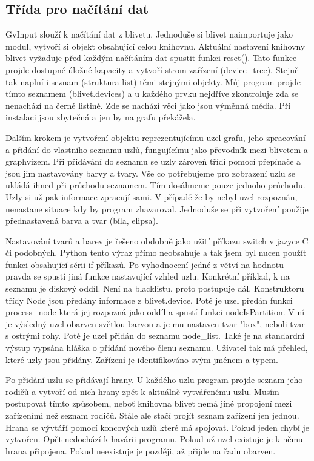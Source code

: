 \documentclass[color,table,oneside,nolot,nolof]{fithesis}
\begin{document}
\subsection{Třída pro načítání dat}
	GvInput slouží k načítání dat z blivetu. Jednoduše si blivet naimportuje jako modul, vytvoří si objekt obsahující celou knihovnu. Aktuální nastavení knihovny blivet vyžaduje před 
	každým načítáním dat spustit funkci reset(). Tato funkce projde dostupné úložné kapacity a vytvoří strom zařízení (device_tree). Stejně tak naplní i seznam (struktura list) těmi
	stejnými objekty. Můj program projde tímto seznamem (blivet.devices) a u každého prvku nejdříve zkontroluje zda se nenachází na černé listině. Zde se nachází věci jako jsou 
	výměnná média. Při instalaci jsou zbytečná a jen by na grafu překážela.

	Dalším krokem je vytvoření objektu reprezentujícímu uzel grafu, jeho zpracování a přidání do vlastního seznamu uzlů, fungujícímu jako převodník mezi blivetem a graphvizem. Při
	přidávání do seznamu se uzly zároveň třídí pomocí přepínače a jsou jim nastavovány barvy a tvary. Vše co potřebujeme pro zobrazení uzlu se ukládá ihned při průchodu seznamem. 
	Tím dosáhneme pouze jednoho průchodu. Uzly si už pak informace zpracují sami. V případě že by nebyl uzel rozpoznán, nenastane situace kdy by program zhavaroval. Jednoduše 
	se při vytvoření použije přednastavená barva a tvar (bíla, elipsa).

	Nastavování tvarů a barev je řešeno obdobně jako užití příkazu switch v jazyce C či podobných. Python tento výraz přímo neobsahuje a tak jsem byl nucen použít funkci obsahující 
	sérii if příkazů. Po vyhodnocení jedné z větví na hodnotu pravda se spustí jiná funkce nastavující vzhled uzlu. Konkrétní příklad, k na seznamu je diskový oddíl. Není na blacklistu,
	proto postupuje dál. Konstruktoru třídy Node jsou předány informace z blivet.device. Poté je uzel předán funkci process_node která jej rozpozná jako oddíl a spustí funkci 
	nodeIsPartition. V ní je výsledný uzel obarven světlou barvou a je mu nastaven tvar "box", neboli tvar s ostrými rohy. Poté je uzel přidán do seznamu node_list. Také je na
	standardní výstup vypsána hláška o přidání nového členu seznamu. Uživatel tak má přehled, které uzly jsou přidány. Zařízení je identifikováno svým jménem a typem.

	Po přidání uzlu se přidávají hrany. U každého uzlu program projde seznam jeho rodičů a vytvoří od nich hrany zpět k aktuálně vytvářenému uzlu. Musím postupovat tímto způsobem, neboť
	knihovna blivet nemá jiné propojení mezi zařízeními než seznam rodičů. Stále ale stačí projít seznam zařízení jen jednou. Hrana se vývtáří pomocí koncových uzlů které má spojovat.
	Pokud jeden chybí je vytvořen. Opět nedochází k havárii programu. Pokud už uzel existuje je k němu hrana připojena. Pokud neexistuje je později, až přijde na řadu obarven.
\end{document}
